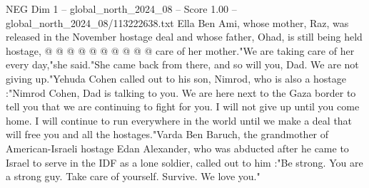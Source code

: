\begin{textsample}{NEG Dim 1 – global\_north\_2024\_08 – Score 1.00 – global\_north\_2024\_08/113222638.txt}
Ella Ben Ami, whose mother, Raz, was released in the November hostage deal and whose father, Ohad, is still being held hostage, @ @ @ @ @ @ @ @ @ @ care of her mother."We are taking care of her every day,"she said."She came back from there, and so will you, Dad.
We are not giving up."Yehuda Cohen called out to his son, Nimrod, who is also a hostage :"Nimrod Cohen, Dad is talking to you.
We are here next to the Gaza border to tell you that we are continuing to fight for you.
I will not give up until you come home.
I will continue to run everywhere in the world until we make a deal that will free you and all the hostages."Varda Ben Baruch, the grandmother of American-Israeli hostage Edan Alexander, who was abducted after he came to Israel to serve in the IDF as a lone soldier, called out to him :"Be strong.
You are a strong guy.
Take care of yourself.
Survive.
We love you."

\end{textsample}
